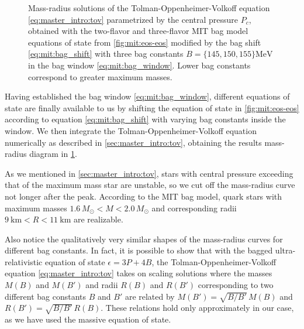 \begin{figure}[t]
\caption{\label{fig:mit:mass_radius}%
Mass-radius solutions of the Tolman-Oppenheimer-Volkoff equation \eqref{eq:master_intro:tov} parametrized by the central pressure $P_c$,
obtained with the two-flavor and three-flavor MIT bag model equations of state from \cref{fig:mit:eos-eos}
modified by the bag shift \eqref{eq:mit:bag_shift} with three bag constants $B = \{145,150,155\} \si{\mega\electronvolt}$ in the bag window \eqref{eq:mit:bag_window}.
Lower bag constants correspond to greater maximum masses.
}
\end{figure}


Having established the bag window \eqref{eq:mit:bag_window},
different equations of state are finally available to us by shifting the equation of state in \cref{fig:mit:eos-eos}
according to equation \eqref{eq:mit:bag_shift} with varying bag constants inside the window.
We then integrate the Tolman-Oppenheimer-Volkoff equation numerically as described in \cref{sec:master_intro:tov},
obtaining the results mass-radius diagram in \cref{fig:mit:mass_radius}.

As we mentioned in \cref{sec:master_intro:tov},
stars with central pressure exceeding that of the maximum mass star are unstable,
so we cut off the mass-radius curve not longer after the peak.
According to the MIT bag model,
quark stars with maximum masses $1.6 \, M_\odot < M < 2.0 \, M_\odot$ and corresponding radii $\SI{9}{\kilo\meter} < R < \SI{11}{\kilo\meter}$ are realizable.

Also notice the qualitatively very similar shapes of the mass-radius curves for different bag constants.
In fact, it is possible to show that with the bagged ultra-relativistic equation of state $\epsilon = 3P + 4B$,
the Tolman-Oppenheimer-Volkoff equation \eqref{eq:master_intro:tov} takes on scaling solutions
where the masses $M(B)$ and $M(B')$ and radii $R(B)$ and $R(B')$ corresponding to two different bag constants $B$ and $B'$
are related by $M(B') = \sqrt{B/B'} \, M(B)$ and $R(B') = \sqrt{B/B'} \, R(B)$. \cite[equation 8.29]{ref:glendenning}
These relations hold only approximately in our case, as we have used the massive equation of state.
